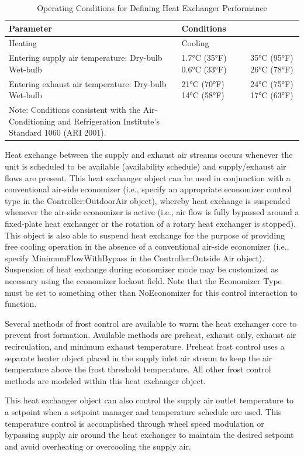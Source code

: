 \begin{longtable}[c]{p{3.0in}p{1.5in}p{1.5in}}
\caption{  Operating Conditions for Defining Heat Exchanger Performance \protect \label{table:operating-conditions-for-defining-heat}}\\
\toprule 
Parameter & Conditions \tabularnewline \midrule
\endhead
Heating & Cooling \tabularnewline
Entering supply air temperature:  Dry-bulb  Wet-bulb & 1.7°C (35°F)  0.6°C (33°F) & 35°C (95°F)  26°C (78°F) \tabularnewline
Entering exhaust air temperature:  Dry-bulb  Wet-bulb & 21°C (70°F)  14°C (58°F) & 24°C (75°F)  17°C (63°F) \tabularnewline
Note: Conditions consistent with the Air-Conditioning and Refrigeration Institute’s Standard 1060 (ARI 2001). \tabularnewline
\bottomrule
\end{longtable}

Heat exchange between the supply and exhaust air streams occurs whenever the unit is scheduled to be available (availability schedule) and supply/exhaust air flows are present. This heat exchanger object can be used in conjunction with a conventional air-side economizer (i.e., specify an appropriate economizer control type in the Controller:OutdoorAir object), whereby heat exchange is suspended whenever the air-side economizer is active (i.e., air flow is fully bypassed around a fixed-plate heat exchanger or the rotation of a rotary heat exchanger is stopped). This object is also able to suspend heat exchange for the purpose of providing free cooling operation in the absence of a conventional air-side economizer (i.e., specify MinimumFlowWithBypass in the Controller:Outside Air object). Suspension of heat exchange during economizer mode may be customized as necessary using the economizer lockout field. Note that the Economizer Type must be set to something other than NoEconomizer for this control interaction to function.

Several methods of frost control are available to warm the heat exchanger core to prevent frost formation. Available methods are preheat, exhaust only, exhaust air recirculation, and minimum exhaust temperature. Preheat frost control uses a separate heater object placed in the supply inlet air stream to keep the air temperature above the frost threshold temperature. All other frost control methods are modeled within this heat exchanger object.

This heat exchanger object can also control the supply air outlet temperature to a setpoint when a setpoint manager and temperature schedule are used. This temperature control is accomplished through wheel speed modulation or bypassing supply air around the heat exchanger to maintain the desired setpoint and avoid overheating or overcooling the supply air.


